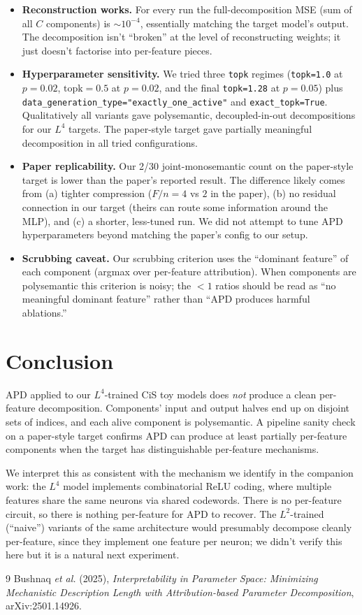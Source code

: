 \documentclass[11pt]{article}
\begin{document}
\begin{itemize}
\item \textbf{Reconstruction works.} For every run the full-decomposition
  MSE (sum of all $C$ components) is $\sim 10^{-4}$, essentially matching
  the target model's output. The decomposition isn't ``broken'' at the
  level of reconstructing weights; it just doesn't factorise into
  per-feature pieces.
\item \textbf{Hyperparameter sensitivity.} We tried three \texttt{topk}
  regimes (\texttt{topk=1.0} at $p=0.02$, $\mathrm{topk}=0.5$ at $p=0.02$,
  and the final \texttt{topk=1.28} at $p=0.05$) plus
  \texttt{data\_generation\_type="exactly\_one\_active"} and
  \texttt{exact\_topk=True}. Qualitatively all variants gave
  polysemantic, decoupled-in-out decompositions for our $L^4$ targets.
  The paper-style target gave partially meaningful decomposition in all
  tried configurations.
\item \textbf{Paper replicability.} Our 2/30 joint-monosemantic count on
  the paper-style target is lower than the paper's reported result. The
  difference likely comes from (a) tighter compression ($F/n=4$ vs $2$ in
  the paper), (b) no residual connection in our target (theirs can route
  some information around the MLP), and (c) a shorter, less-tuned run.
  We did not attempt to tune APD hyperparameters beyond matching the
  paper's config to our setup.
\item \textbf{Scrubbing caveat.} Our scrubbing criterion uses the
  ``dominant feature'' of each component (argmax over per-feature
  attribution). When components are polysemantic this criterion is noisy;
  the $<1$ ratios should be read as ``no meaningful dominant feature''
  rather than ``APD produces harmful ablations.''
\end{itemize}

\section{Conclusion}

APD applied to our $L^4$-trained CiS toy models does \emph{not} produce a
clean per-feature decomposition. Components' input and output halves end
up on disjoint sets of indices, and each alive component is polysemantic.
A pipeline sanity check on a paper-style target confirms APD can produce
at least partially per-feature components when the target has
distinguishable per-feature mechanisms.

We interpret this as consistent with the mechanism we identify in the
companion work: the $L^4$ model implements combinatorial ReLU coding,
where multiple features share the same neurons via shared codewords.
There is no per-feature circuit, so there is nothing per-feature for APD
to recover. The $L^2$-trained (``naive'') variants of the same
architecture would presumably decompose cleanly per-feature, since they
implement one feature per neuron; we didn't verify this here but it is
a natural next experiment.

\begin{thebibliography}{9}
 Bushnaq \textit{et al.} (2025), \emph{Interpretability
in Parameter Space: Minimizing Mechanistic Description Length with
Attribution-based Parameter Decomposition}, arXiv:2501.14926.
\end{thebibliography}
\end{document}
